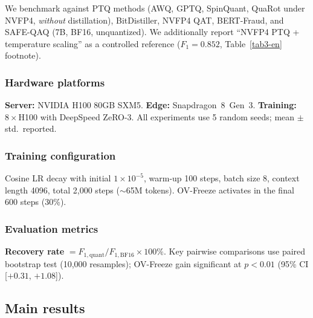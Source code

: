 \documentclass[final,5p,times,number]{elsarticle}
\begin{document}
We benchmark against PTQ methods (AWQ, GPTQ, SpinQuant, QuaRot under NVFP4, \emph{without} distillation), BitDistiller, NVFP4 QAT, BERT-Fraud, and SAFE-QAQ (7B, BF16, unquantized). We additionally report ``NVFP4 PTQ + temperature scaling'' as a controlled reference ($F_1=0.852$, Table~\ref{tab3-en} footnote).

\subsubsection{Hardware platforms}

\textbf{Server:} NVIDIA H100 80GB SXM5. \textbf{Edge:} Snapdragon~8~Gen~3. \textbf{Training:} $8\times$H100 with DeepSpeed ZeRO-3. All experiments use 5 random seeds; mean $\pm$ std.\ reported.

\subsubsection{Training configuration}

Cosine LR decay with initial $1\times 10^{-5}$, warm-up 100 steps, batch size 8, context length 4096, total 2{,}000 steps ($\sim$65M tokens). OV-Freeze activates in the final 600 steps (30\%).

\subsubsection{Evaluation metrics}

\textbf{Recovery rate} $= F_{1,\mathrm{quant}}/F_{1,\mathrm{BF16}}\times 100\%$. Key pairwise comparisons use paired bootstrap test (10{,}000 resamples); OV-Freeze gain significant at $p<0.01$ (95\% CI [$+0.31$, $+1.08$]).

\subsection{Main results}\label{sec:main-results}
\end{document}

